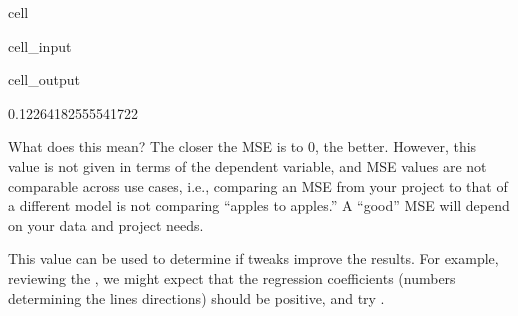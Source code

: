 \documentclass[letterpaper,10pt,english]{jupyterBook}
\begin{document}
\begin{sphinxuseclass}{cell}\begin{sphinxVerbatimInput}

\begin{sphinxuseclass}{cell_input}
\begin{sphinxVerbatim}[commandchars=\\\{\}]
   

 
\end{sphinxVerbatim}

\end{sphinxuseclass}\end{sphinxVerbatimInput}
\begin{sphinxVerbatimOutput}

\begin{sphinxuseclass}{cell_output}
\begin{sphinxVerbatim}[commandchars=\\\{\}]
0.12264182555541722
\end{sphinxVerbatim}

\end{sphinxuseclass}\end{sphinxVerbatimOutput}

\end{sphinxuseclass}
\sphinxAtStartPar
What does this mean? The closer the MSE is to 0, the better. However, this value is not given in terms of the dependent variable, and MSE values are not comparable across use cases, i.e., comparing an MSE from your project to that of a different model is not comparing “apples to apples.” A “good” MSE will depend on your data and project needs.

\sphinxAtStartPar
This value can be used to determine if tweaks improve the results. For example, reviewing the {\hyperref[\detokenize{task2_c/example_sup_class/sup_class_ex-process:sup-class-ex-descriptive-methods-and-visualizations}]{}}, we might expect that the regression coefficients (numbers determining the lines directions) should be positive, and try .
\end{document}
